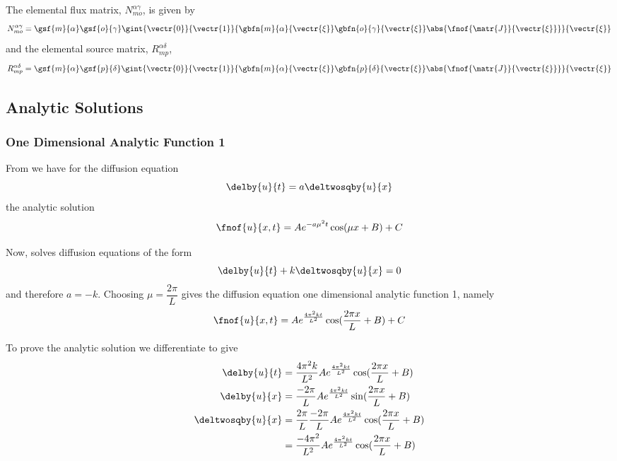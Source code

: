 The elemental flux matrix, $N^{\alpha\gamma}_{mo}$, is given by
\begin{equation}
  N^{\alpha\gamma}_{mo} =\gsf{m}{\alpha}\gsf{o}{\gamma}
  \gint{\vectr{0}}{\vectr{1}}{\gbfn{m}{\alpha}{\vectr{\xi}}\gbfn{o}{\gamma}{\vectr{\xi}}
    \abs{\fnof{\matr{J}}{\vectr{\xi}}}}{\vectr{\xi}}
\end{equation}
and the elemental source matrix, $R^{\alpha\delta}_{mp}$, 
\begin{equation}
  R^{\alpha\delta}_{mp}=\gsf{m}{\alpha}\gsf{p}{\delta}
  \gint{\vectr{0}}{\vectr{1}}{\gbfn{m}{\alpha}{\vectr{\xi}}\gbfn{p}{\delta}{\vectr{\xi}}
    \abs{\fnof{\matr{J}}{\vectr{\xi}}}}{\vectr{\xi}}
\end{equation}

\subsection{Analytic Solutions}
\label{subsec:DiffusionEquationAnalyticSolutions}

\subsubsection{One Dimensional Analytic Function 1}

From  we have for the \oned diffusion equation
\begin{equation}
  \delby{u}{t}=a\deltwosqby{u}{x}
\end{equation}
the analytic solution
\begin{equation}
  \fnof{u}{x,t}=Ae^{-a\mu^{2}t}\cos(\mu x + B) + C
\end{equation}

Now, \OpenCMISS solves diffusion equations of the form
\begin{equation}
  \delby{u}{t}+k\deltwosqby{u}{x}=0
  \label{eqn:OpenCMISSDiffusionEquationOneDim1}
\end{equation}
and therefore $a=-k$. Choosing $\mu=\dfrac{2\pi}{L}$ gives the
\OpenCMISS diffusion equation one dimensional analytic function 1, namely
\begin{equation}
  \fnof{u}{x,t}=Ae^{\frac{4\pi^{2}kt}{L^{2}}}\cos(\frac{2\pi x}{L} + B) + C
  \label{eqn:AnalyticDiffusionEquationOneDim1}
\end{equation}

To prove the analytic solution we differentiate
 to give
\begin{align}
    \delby{u}{t} &=
    \dfrac{4\pi^{2}k}{L^{2}}Ae^{\frac{4\pi^{2}kt}{L^{2}}}\cos(\frac{2\pi x}{L} + B) \\
    \delby{u}{x} &=
    \dfrac{-2\pi}{L}Ae^{\frac{4\pi^{2}kt}{L^{2}}}\sin(\frac{2\pi x}{L} + B) \\
    \deltwosqby{u}{x} &=
    \dfrac{2\pi}{L}\dfrac{-2\pi}{L}Ae^{\frac{4\pi^{2}kt}{L^{2}}}\cos(\frac{2\pi x}{L} + B) \\
    & = \dfrac{-4\pi^{2}}{L^{2}}Ae^{\frac{4\pi^{2}kt}{L^{2}}}\cos(\frac{2\pi x}{L} + B)
  \label{eqn:AnalyticDiffusionEquationOneDim1Derivatives}
\end{align}

